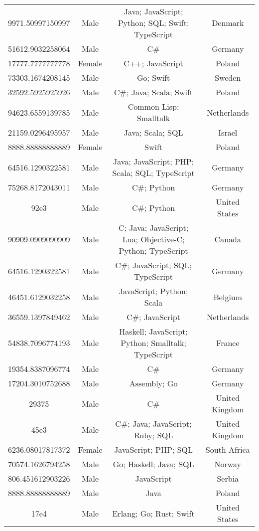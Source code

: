 \begin{center}
\begin{tabular}{ |c|c|c|c| }
9971.50997150997  &  Male  &  Java; JavaScript; Python; SQL; Swift; TypeScript  &  Denmark  \\ 
51612.9032258064  &  Male  &  C\#  &  Germany  \\ 
17777.7777777778  &  Female  &  C++; JavaScript  &  Poland  \\ 
73303.1674208145  &  Male  &  Go; Swift  &  Sweden  \\ 
32592.5925925926  &  Male  &  C\#; Java; Scala; Swift  &  Poland  \\ 
94623.6559139785  &  Male  &  Common Lisp; Smalltalk  &  Netherlands  \\ 
21159.0296495957  &  Male  &  Java; Scala; SQL  &  Israel  \\ 
8888.88888888889  &  Female  &  Swift  &  Poland  \\ 
64516.1290322581  &  Male  &  Java; JavaScript; PHP; Scala; SQL; TypeScript  &  Germany  \\ 
75268.8172043011  &  Male  &  C\#; Python  &  Germany  \\ 
92e3  &  Male  &  C\#; Python  &  United States  \\ 
90909.0909090909  &  Male  &  C; Java; JavaScript; Lua; Objective-C; Python; TypeScript  &  Canada  \\ 
64516.1290322581  &  Male  &  C\#; JavaScript; SQL; TypeScript  &  Germany  \\ 
46451.6129032258  &  Male  &  JavaScript; Python; Scala  &  Belgium  \\ 
36559.1397849462  &  Male  &  C\#; JavaScript  &  Netherlands  \\ 
54838.7096774193  &  Male  &  Haskell; JavaScript; Python; Smalltalk; TypeScript  &  France  \\ 
19354.8387096774  &  Male  &  C\#  &  Germany  \\ 
17204.3010752688  &  Male  &  Assembly; Go  &  Germany  \\ 
29375  &  Male  &  C\#  &  United Kingdom  \\ 
45e3  &  Male  &  C\#; Java; JavaScript; Ruby; SQL  &  United Kingdom  \\ 
6236.08017817372  &  Female  &  JavaScript; PHP; SQL  &  South Africa  \\ 
70574.1626794258  &  Male  &  Go; Haskell; Java; SQL  &  Norway  \\ 
806.451612903226  &  Male  &  JavaScript  &  Serbia  \\ 
8888.88888888889  &  Male  &  Java  &  Poland  \\ 
17e4  &  Male  &  Erlang; Go; Rust; Swift  &  United States  \\ 

\end{tabular}
\end{center}
